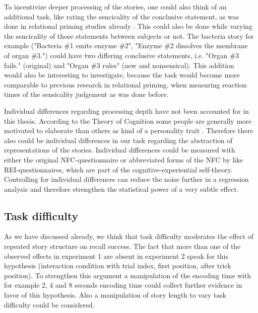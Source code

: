 \documentclass[a4paper,man,natbib,floatsintext,import]{apa6}
\begin{document}
To incentivize deeper processing of the stories, one could also think of an additional task, like rating the sencicality of the conclusive statement, as was done in relational priming studies already \citep{Estes2006,Popov2015}. This could also be done while varying the sencicality of those statements between subjects or not. The bacteria story for example ("Bacteria \#1 emits enzyme \#2", "Enzyme \#2 dissolves the membrane of organ \#3.") could have two differing conclusive statements, i.e. "Organ \#3 fails." (original) and "Organ \#3 rules" (new and nonsensical). This addition would also be interesting to investigate, because the task would become more comparable to previous research in relational priming, when measuring reaction times of the sensicality judgement as was done before.

Individual differences regarding processing depth have not been accounted for in this thesis. According to the Theory of Cognition some people are generally more motivated to elaborate than others as kind of a personality trait \citep{Cacioppo1982,Cacioppo1996}. Therefore there also could be individual differences in our task regarding the abstraction of representations of the stories. Individual differences could be measured with either the original NFC-questionnaire \citep{Cacioppo1982} or abbreviated forms of the NFC by \cite{Epstein1996} like REI-questionnaires, which are part of the cognitive-experiential self-theory. Controlling for individual differences can reduce the noise further in a regression analysis and therefore strengthen the statistical power of a very subtle effect.

\subsection{Task difficulty}
As we have discussed already, we think that task difficulty moderates the effect of repeated story structure on recall success. The fact that more than one of the observed effects in experiment 1 are absent in experiment 2  speak for this hypothesis (interaction condition with trial index, first position, after trick position). To strengthen this argument a manipulation of the encoding time with for example 2, 4 and 8 seconds encoding time could collect further evidence in favor of this hypothesis. Also a manipulation of story length to vary task difficulty could be considered.

\newpage
\end{document}
